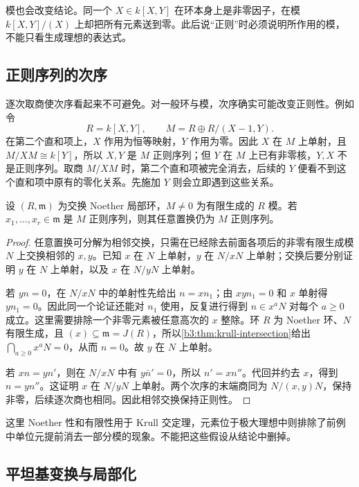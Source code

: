 \ProseParagraphBreak
模也会改变结论。同一个 \(X\in k[X,Y]\) 在环本身上是非零因子，在模 \(k[X,Y]/(X)\) 上却把所有元素送到零。此后说“正则”时必须说明所作用的模，不能只看生成理想的表达式。

\subsection{正则序列的次序}
\label{b3:subsec:1501:02}

逐次取商使次序看起来不可避免。对一般环与模，次序确实可能改变正则性。例如令
\[
	R=k[X,Y],\qquad M=R\oplus R/(X-1,Y).
\]
在第二个直和项上，\(X\) 作用为恒等映射，\(Y\) 作用为零。因此 \(X\) 在 \(M\) 上单射，且 \(M/XM\cong k[Y]\)，所以 \(X,Y\) 是 \(M\) 正则序列；但 \(Y\) 在 \(M\) 上已有非零核，\(Y,X\) 不是正则序列。取商 \(M/XM\) 时，第二个直和项被完全消去，后续的 \(Y\) 便看不到这个直和项中原有的零化关系。先施加 \(Y\) 则会立即遇到这些关系。

\begin{theorem}\label{b3:thm:regular-sequence-permutation}
	设 \((R,\mathfrak m)\) 为交换 Noether 局部环，\(M\ne0\) 为有限生成的 \(R\) 模。若 \(x_1,\ldots,x_r\in\mathfrak m\) 是 \(M\) 正则序列，则其任意置换仍为 \(M\) 正则序列。
\end{theorem}
\begin{proof}
	任意置换可分解为相邻交换，只需在已经除去前面各项后的非零有限生成模 \(N\) 上交换相邻的 \(x,y\)。已知 \(x\) 在 \(N\) 上单射，\(y\) 在 \(N/xN\) 上单射；交换后要分别证明 \(y\) 在 \(N\) 上单射，以及 \(x\) 在 \(N/yN\) 上单射。

	若 \(yn=0\)，在 \(N/xN\) 中的单射性先给出 \(n=xn_1\)；由 \(xyn_1=0\) 和 \(x\) 单射得 \(yn_1=0\)。因此同一个论证还能对 \(n_1\) 使用，反复进行得到 \(n\in x^aN\) 对每个 \(a\ge0\) 成立。这里需要排除一个非零元素被任意高次的 \(x\) 整除。环 \(R\) 为 Noether 环、\(N\) 有限生成，且 \((x)\subseteq\mathfrak m=J(R)\)，所以\cref{b3:thm:krull-intersection}给出 \(\bigcap_{a\ge0}x^aN=0\)，从而 \(n=0\)。故 \(y\) 在 \(N\) 上单射。

	若 \(xn=yn'\)，则在 \(N/xN\) 中有 \(y\bar n'=0\)，所以 \(n'=xn''\)。代回并约去 \(x\)，得到 \(n=yn''\)。这证明 \(x\) 在 \(N/yN\) 上单射。两个次序的末端商同为 \(N/(x,y)N\)，保持非零，后续逐次商也相同。因此相邻交换保持正则性。
\end{proof}

这里 Noether 性和有限性用于 Krull 交定理，元素位于极大理想中则排除了前例中单位元提前消去一部分模的现象。不能把这些假设从结论中删掉。

\subsection{平坦基变换与局部化}
\label{b3:subsec:1501:03}

